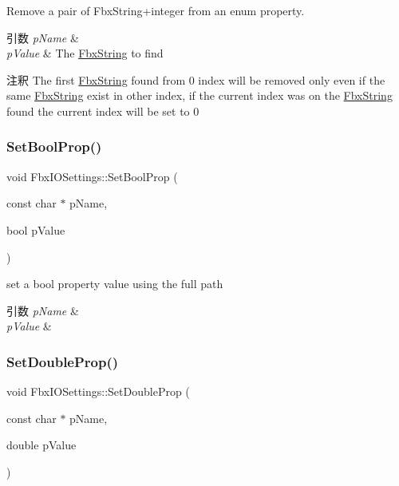 Remove a pair of Fbx\+String+integer from an enum property. 
\begin{DoxyParams}{引数}
{\em p\+Name} & \\
\hline
{\em p\+Value} & The \hyperlink{class_fbx_string}{Fbx\+String} to find \\
\hline
\end{DoxyParams}
\begin{DoxyRemark}{注釈}
The first \hyperlink{class_fbx_string}{Fbx\+String} found from 0 index will be removed only even if the same \hyperlink{class_fbx_string}{Fbx\+String} exist in other index, if the current index was on the \hyperlink{class_fbx_string}{Fbx\+String} found the current index will be set to 0 
\end{DoxyRemark}
\mbox{\label{class_fbx_i_o_settings_ad2c660ef846b66dcf569079299391745}} 
\subsubsection{\texorpdfstring{Set\+Bool\+Prop()}{SetBoolProp()}}
{\footnotesize\ttfamily void Fbx\+I\+O\+Settings\+::\+Set\+Bool\+Prop (\begin{DoxyParamCaption}\item[{const char $\ast$}]{p\+Name,  }\item[{bool}]{p\+Value }\end{DoxyParamCaption})}

set a bool property value using the full path 
\begin{DoxyParams}{引数}
{\em p\+Name} & \\
\hline
{\em p\+Value} & \\
\hline
\end{DoxyParams}
\mbox{\label{class_fbx_i_o_settings_ae97bbc6c4ae0534788dba82e3cfd0c4f}} 
\subsubsection{\texorpdfstring{Set\+Double\+Prop()}{SetDoubleProp()}}
{\footnotesize\ttfamily void Fbx\+I\+O\+Settings\+::\+Set\+Double\+Prop (\begin{DoxyParamCaption}\item[{const char $\ast$}]{p\+Name,  }\item[{double}]{p\+Value }\end{DoxyParamCaption})}

